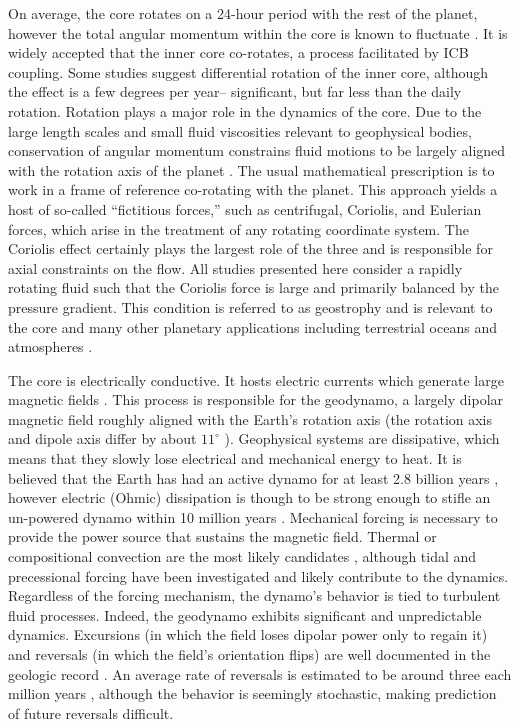 On average, the core rotates on a 24-hour period with the rest of the planet, however the total angular momentum within the core is known to fluctuate \citep{rH00}.
It is widely accepted that the inner core co-rotates, a process facilitated by ICB coupling. Some studies \citep[e.g.][]{jV25} suggest differential rotation of the inner core, although the effect is a few degrees per year-- significant, but far less than the daily rotation.
Rotation plays a major role in the dynamics of the core.
Due to the large length scales and small fluid viscosities relevant to geophysical bodies, conservation of angular momentum constrains fluid motions to be largely aligned with the rotation axis of the planet \citep{sC61}.
The usual mathematical prescription is to work in a frame of reference co-rotating with the planet. 
This approach yields a host of so-called ``fictitious forces,'' such as centrifugal, Coriolis, and Eulerian forces, which arise in the treatment of any rotating coordinate system. 
The Coriolis effect certainly plays the largest role of the three and is responsible for axial constraints on the flow.
All studies presented here consider a rapidly rotating fluid such that the Coriolis force is large and primarily balanced by the pressure gradient. 
This condition is referred to as geostrophy and is relevant to the core \citep[e.g.][]{kZ07} and many other planetary applications including terrestrial oceans and atmospheres \citep[e.g.][]{gV06}.

The core is electrically conductive.
It hosts electric currents which generate large magnetic fields \citep{aC98, sC61}. 
This process is responsible for the geodynamo, a largely dipolar magnetic field roughly aligned with the Earth's rotation axis (the rotation axis and dipole axis differ by about $11^{\circ}$ \citep{dS07}). 
Geophysical systems are dissipative, which means that they slowly lose electrical and mechanical energy to heat. 
It is believed that the Earth has had an active dynamo for at least 2.8 billion years \citep{jA07},
however electric (Ohmic) dissipation is though to be strong enough to stifle an un-powered dynamo within 10 million years \citep{aC98}. 
Mechanical forcing is necessary to provide the power source that sustains the magnetic field. 
Thermal or compositional convection are the most likely candidates \citep{sB95,dG77}, although tidal \citep{rK18} and precessional \citep{dC19} forcing have been investigated and likely contribute to the dynamics.
Regardless of the forcing mechanism, the dynamo's behavior is tied to turbulent fluid processes. Indeed, the geodynamo exhibits significant and unpredictable dynamics. 
Excursions (in which the field loses dipolar power only to regain it) and reversals (in which the field's orientation flips) are well documented in the geologic record \citep{mA19,cC00,cC16,cC24,cJ97}. 
An average rate of reversals is estimated to be around three each million years \citep{jJ94c1}, although the behavior is seemingly stochastic, making prediction of future reversals difficult. 

